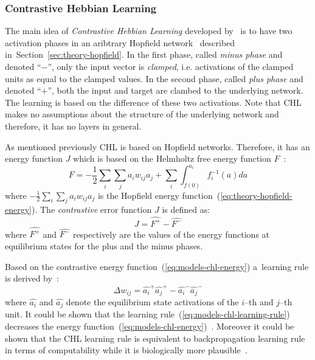
\subsubsection{Contrastive Hebbian Learning}
\label{sec:models-chl} 

The main idea of \emph{Contrastive Hebbian Learning} developed by~\citet{movellan1990contrastive} is to have two activation phases in an aribtrary Hopfield network~\citep{hopfield1984neurons} described in~Section~\ref{sec:theory-hopfield}. In the first phase, called \emph{minus phase} and denoted ``$-$'', only the input vector is \emph{clamped}, i.e. activations of the clamped units as equal to the clamped values. In the second phase, called \emph{plus phase} and denoted ``$+$'', both the input and target are clambed to the underlying network. The learning is based on the difference of these two activations. Note that CHL makes no assumptions about the structure of the underlying network and therefore, it has no layers in general. 

As mentioned previously CHL is based on Hopfield networks. Therefore, it has an energy function $J$ which is based on the Helmholtz free energy function $F$~\citep{hinton1989deterministic}:
\begin{equation}
  \label{eq:models-chl-helmholtz}
  F = -\frac{1}{2}\sum_i\sum_ja_iw_{ij}a_j + \sum_i \int_{f(0)}^{a_i} f_i^{-1}(a)da
\end{equation} 
where $-\frac{1}{2}\sum_i\sum_ja_iw_{ij}a_j$ is the Hopfield energy function~(\ref{eq:theory-hopfield-energy}). The \emph{contrastive} error function $J$ is defined as: 
\begin{equation}
  \label{eq:models-chl-energy}
  J = \hat{F^{+}} - \hat{F^{-}}
\end{equation} 
where $\hat{F^{+}}$ and $\hat{F^{-}}$ respectively are the values of the energy functions at equilibrium states for the plus and the minus phases. 

Based on the contrastive energy function~(\ref{eq:models-chl-energy}) a~learning rule is derived by~\citet{movellan1990contrastive}: 
\begin{equation}
  \label{eq:models-chl-learning-rule}
  \Delta w_{ij} = \hat{a_i}^{+}\hat{a_j}^{+} - \hat{a_i}^{-}\hat{a_j}^{-}
\end{equation}
where $\hat{a_i}$ and $\hat{a_j}$ denote the equilibrium state activations of the $i$--th and $j$--th unit. It could be shown that the learning rule~(\ref{eq:models-chl-learning-rule}) decreases the energy function~(\ref{eq:models-chl-energy})~\citep{movellan1990contrastive}. Moreover it could be shown that the CHL learning rule is equivalent to backpropagation learning rule in terms of computability while it is biologically more plausible~\citep{o1996bio, xie2003equivalence}. 

   
